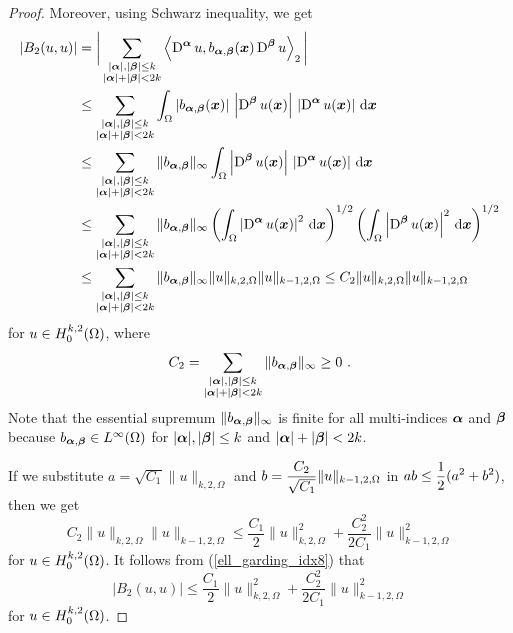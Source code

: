 \begin{proof}
Moreover, using Schwarz inequality, we get
\begin{align}
\left| B_2(u,u) \right|
&= \bigg| \sum_{\substack{|{\bm{\alpha}}|,|{\bm{\beta}}|\leq k\\
|{\bm{\alpha}}|+|{\bm{\beta}}|<2k}}
\left\langle{\operatorname{D}^{{\bm{\alpha}}} u} , {b_{{\bm{\alpha}},{\bm{\beta}}}({\bm{x}})
\operatorname{D}^{{\bm{\beta}}} u}\right\rangle_2 \bigg| \\
&\leq \sum_{\substack{|{\bm{\alpha}}|,|{\bm{\beta}}|\leq k\\
|{\bm{\alpha}}|+|{\bm{\beta}}|<2k}}
\int_{\Omega} \left| b_{{\bm{\alpha}},{\bm{\beta}}}({\bm{x}})\right|\,
\left| \operatorname{D}^{{\bm{\beta}}} u({\bm{x}}) \right| \,
\left| \operatorname{D}^{{\bm{\alpha}}} u({\bm{x}}) \right| \,\mathrm{d}{{\bm{x}}} \nonumber \\
&\leq \sum_{\substack{|{\bm{\alpha}}|,|{\bm{\beta}}|\leq k\\
|{\bm{\alpha}}|+|{\bm{\beta}}|<2k}}
\| b_{{\bm{\alpha}},{\bm{\beta}}} \|_{\infty}
\int_{\Omega} \left| \operatorname{D}^{{\bm{\beta}}} u({\bm{x}}) \right| \,
\left| \operatorname{D}^{{\bm{\alpha}}} u({\bm{x}}) \right| \,\mathrm{d}{{\bm{x}}} \nonumber \\
&\leq \sum_{\substack{|{\bm{\alpha}}|,|{\bm{\beta}}|\leq k\\
|{\bm{\alpha}}|+|{\bm{\beta}}|<2k}}
\| b_{{\bm{\alpha}},{\bm{\beta}}} \|_{\infty}
\left( \int_\Omega \left| \operatorname{D}^{{\bm{\alpha}}} u({\bm{x}}) \right|^2
\,\mathrm{d}{{\bm{x}}}\right)^{1/2}
\left( \int_\Omega \left| \operatorname{D}^{{\bm{\beta}}} u({\bm{x}}) \right|^2 \,\mathrm{d}{{\bm{x}}}
\right)^{1/2} \nonumber \\
&\leq \sum_{\substack{|{\bm{\alpha}}|,|{\bm{\beta}}|\leq k\\
|{\bm{\alpha}}|+|{\bm{\beta}}|<2k}}
\| b_{{\bm{\alpha}},{\bm{\beta}}} \|_{\infty}
\|u\|_{k,2,\Omega} \|u\|_{k-1,2,\Omega} \leq C_2 \|u\|_{k,2,\Omega}
\|u\|_{k-1,2,\Omega} \label{ell_garding_idx8}
\end{align}
for $\displaystyle u \in H^{k,2}_0(\Omega)$, where
\[
C_2 = \sum_{\substack{|{\bm{\alpha}}|,|{\bm{\beta}}|\leq k\\
|{\bm{\alpha}}|+|{\bm{\beta}}|<2k}}
\| b_{{\bm{\alpha}},{\bm{\beta}}} \|_{\infty} \geq 0 \ .
\]
Note that the essential supremum
$\displaystyle \| b_{{\bm{\alpha}},{\bm{\beta}}} \|_{\infty}$ is finite
for all multi-indices ${\bm{\alpha}}$ and ${\bm{\beta}}$ because
$b_{{\bm{\alpha}},{\bm{\beta}}} \in L^\infty(\Omega)$ for
$|{\bm{\alpha}}|,|{\bm{\beta}}|\leq k$
and $|{\bm{\alpha}}|+|{\bm{\beta}}|<2k$.

If we substitute $a= \sqrt{C_1} \|u\|_{k,2,\Omega}$ and
$\displaystyle b = \frac{C_2}{\sqrt{C_1}}\|u\|_{k-1,2,\Omega}$ in
$\displaystyle ab \leq \frac{1}{2}(a^2+b^2)$, then we get
\[
C_2\|u\|_{k,2,\Omega} \|u\|_{k-1,2,\Omega}
\leq \frac{C_1}{2} \|u\|_{k,2,\Omega}^2 + \frac{C_2^2}{2C_1}\|u\|_{k-1,2,\Omega}^2
\]
for $\displaystyle u \in H^{k,2}_0(\Omega)$.  It follows from
(\ref{ell_garding_idx8}) that
\begin{equation} \label{ell_garding_idx5}
\left|B_2(u,u)\right|
\leq \frac{C_1}{2} \|u\|_{k,2,\Omega}^2 + \frac{C_2^2}{2C_1}\|u\|_{k-1,2,\Omega}^2
\end{equation}
for $\displaystyle u \in H^{k,2}_0(\Omega)$.


\end{proof}
